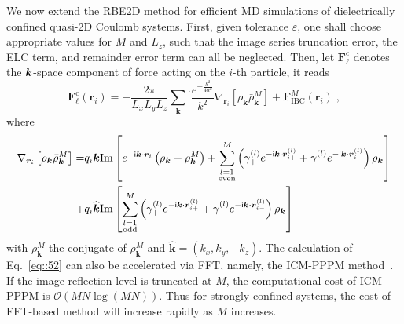 We now extend the RBE2D method for efficient MD simulations of dielectrically confined quasi-2D Coulomb systems. 
First, given tolerance $\varepsilon$, one shall choose appropriate values for $M$ and $L_z$, such that the image series truncation error, the ELC term, and remainder error term can all be neglected. Then, let $\bm{F}_{\ell}^{\text{c}}$ denotes the $\boldsymbol{k}$-space component of force acting on the $i$-th particle, it reads
\begin{equation}\label{eq::52}
\bm{F}_{\ell}^{\text{c}}(\bm{r}_i)=-\frac{2\pi}{L_xL_yL_z}\sum_{\bm{k}}{}^{\prime}\frac{e^{-\frac{k^2}{4\alpha^2}}}{k^2}\nabla_{\bm{r}_i}\left[\rho_{\bm{k}}\bar{\rho}_{\bm{k}}^{M}\right]+\bm{F}_{\text{IBC}}^{M}(\bm{r}_i)\;,%
\end{equation}
where 
\begin{equation}\label{eq::rhorhoM}
\begin{split}
\nabla_{\bm{r}_i}\left[\rho_{\bm{k}}\bar{\rho}_{\bm{k}}^{M}\right]=&q_i\bm{k}\text{Im}\left[e^{-\mathsf i\bm{k}\cdot\bm{r}_i}\left(\rho_{\bm{k}}+\rho_{\bm{k}}^{M}\right)+\sum_{\substack{l=1\\ \text{even}}}^{M}\left(\gamma_{+}^{(l)}e^{-\mathsf i\bm{k}\cdot\bm{r}_{i+}^{(l)}}+\gamma_{-}^{(l)}e^{-\mathsf i\bm{k}\cdot\bm{r}_{i-}^{(l)}}\right)\rho_{\bm{k}}\right]\\
+&q_i\widehat{\bm{k}}\text{Im}\left[\sum_{\substack{l=1\\ \text{odd}}}^{M}\left(\gamma_{+}^{(l)}e^{-\mathsf i\bm{k}\cdot\bm{r}_{i+}^{(l)}}+\gamma_{-}^{(l)}e^{-\mathsf i\bm{k}\cdot\bm{r}_{i-}^{(l)}}\right)\rho_{\bm{k}}\right]
\end{split}
\end{equation}
with $\rho_{\bm{k}}^{M}$ the conjugate of $\bar{\rho}_{\bm{k}}^{M}$ and $\widehat{\bm{k}}=(k_x,k_y,-k_z)$. The calculation of Eq.~\eqref{eq::52} can also be accelerated via FFT, namely, the ICM-PPPM method~\cite{yuan2021particle}. 
If the image reflection level is truncated at $M$, the computational cost of ICM-PPPM is $\mathcal O(MN \log(MN))$. Thus for strongly confined systems, the cost of FFT-based method will increase rapidly as $M$ increases.

